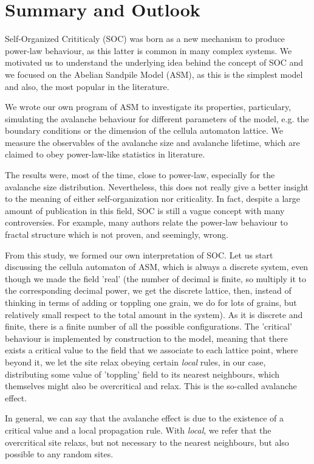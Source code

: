 \chapter{Summary and Outlook}
\thispagestyle{fancy}

Self-Organized Crititicaly (SOC) was born as a new mechanism to produce power-law behaviour, as this latter is common in many complex systems. 
We motivated us to understand the underlying idea behind the concept of SOC and we focused on the Abelian Sandpile Model (ASM),
as this is the simplest model and also, the most popular in the literature. 

We wrote our own program of ASM to investigate its properties, particulary, simulating the avalanche behaviour for different parameters of the model, e.g.
the boundary conditions or the dimension of the cellula automaton lattice. We measure the observables of the avalanche size and avalanche lifetime, 
which are claimed to obey power-law-like statistics in literature. 

The results were, most of the time, close to power-law, especially for the avalanche size distribution. 
Nevertheless, this does not really give a better insight to the meaning of either self-organization nor criticality. 
In fact, despite a large amount of publication in this field, SOC is still a vague concept with many controversies. 
For example, many authors relate the power-law behaviour to fractal structure which is not proven, and seemingly, wrong. 

From this study, we formed our own interpretation of SOC. 
Let us start discussing the cellula automaton of ASM, which is always a discrete system, even though we made the field 'real' 
(the number of decimal is finite, so multiply it to the corresponding decimal power, we get the discrete lattice, then, instead of thinking in terms of adding or toppling one grain, 
we do for lots of grains, but relatively small respect to the total amount in the system).
As it is discrete and finite, there is a finite number of all the possible configurations.
The 'critical' behaviour is implemented by construction to the model, meaning that there exists a critical value to the field that we associate to each lattice point, where beyond it,
we let the site relax obeying certain \emph{local} rules, in our case, distributing some value of 'toppling' field to its nearest neighbours, which themselves might also be overcritical and relax.
This is the so-called avalanche effect. 

In general, we can say that the avalanche effect is due to the existence of a critical value and a local propagation rule.
With \emph{local}, we refer that the overcritical site relaxs, but not necessary to the nearest neighbours, but also possible to any random sites.

